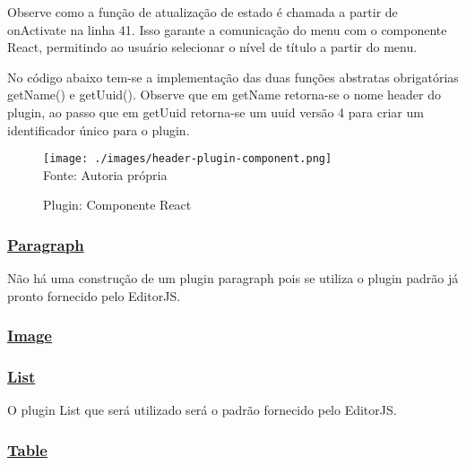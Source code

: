 Observe como a função de atualização de estado é chamada a partir de onActivate
na linha 41. Isso garante a comunicação do menu com o componente React, permitindo
ao usuário selecionar o nível de título a partir do menu.

No código abaixo tem-se a implementação das duas funções abstratas obrigatórias
getName() e getUuid(). Observe que em getName retorna-se o nome header do plugin,
ao passo que em getUuid retorna-se um uuid versão 4 para criar um identificador
único para o plugin.

\begin{Code141fa3100084492bb1367b414729e5c8}
[...]
    getName(): string {
        return 'header';
    }

    getUuid(): string {
        return uuidv4();
    }
}
\end{Code141fa3100084492bb1367b414729e5c8}


\begin{figure}[H]
    \centering
    \caption{Plugin: Componente React}
    \texttt{[image: ./images/header-plugin-component.png]}
    \label{fig:header-plugin-component} \\
    \textnormal{\fontsize{10pt}{12pt}Fonte: Autoria própria}
\end{figure}

\subsubsection{\underline{Paragraph}}

Não há uma construção de um plugin paragraph pois se utiliza
o plugin padrão já pronto fornecido pelo EditorJS.

\subsubsection{\underline{Image}}

\subsubsection{\underline{List}}

O plugin List que será utilizado será o padrão fornecido pelo
EditorJS.

\subsubsection{\underline{Table}}

